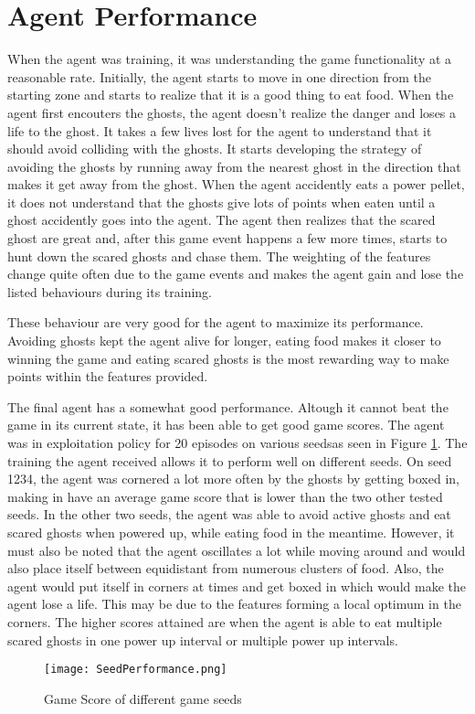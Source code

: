 \documentclass[11pt]{scrartcl}
\begin{document}
\section{Agent Performance}

When the agent was training, it was understanding the game functionality at a reasonable rate. Initially, the agent starts to move in one direction from the starting zone and starts to realize that it is a good thing to eat food. When the agent first encouters the ghosts, the agent doesn't realize the danger and loses a life to the ghost. It takes a few lives lost for the agent to understand that it should avoid colliding with the ghosts. It starts developing the strategy of avoiding the ghosts by running away from the nearest ghost in the direction that makes it get away from the ghost. When the agent accidently eats a power pellet, it does not understand that the ghosts give lots of points when eaten until a ghost accidently goes into the agent. The agent then realizes that the scared ghost are great and, after this game event happens a few more times, starts to hunt down the scared ghosts and chase them. The weighting of the features change quite often due to the game events and makes the agent gain and lose the listed behaviours during its training. 

These behaviour are very good for the agent to maximize its performance. Avoiding ghosts kept the agent alive for longer, eating food makes it closer to winning the game and eating scared ghosts is the most rewarding way to make points within the features provided.

The final agent has a somewhat good performance. Altough it cannot beat the game in its current state, it has been able to get good game scores. The agent was in exploitation policy for 20 episodes on various seedsas seen in Figure \ref{fig:F3}. The training the agent received allows it to perform well on different seeds. On seed 1234, the agent was cornered a lot more often by the ghosts by getting boxed in, making in have an average game score that is lower than the two other tested seeds. In the other two seeds, the agent was able to avoid active ghosts and eat scared ghosts when powered up, while eating food in the meantime. However, it must also be noted that the agent oscillates a lot while moving around and would also place itself between equidistant from numerous clusters of food. Also, the agent would put itself in corners at times and get boxed in which would make the agent lose a life. This may be due to the features forming a local optimum in the corners. The higher scores attained are when the agent is able to eat multiple scared ghosts in one power up interval or multiple power up intervals.

\begin{figure}[ht]
\centering	
\texttt{[image: SeedPerformance.png]}	
\caption{Game Score of different game seeds}
\label{fig:F3}
\end{figure}
\end{document}
